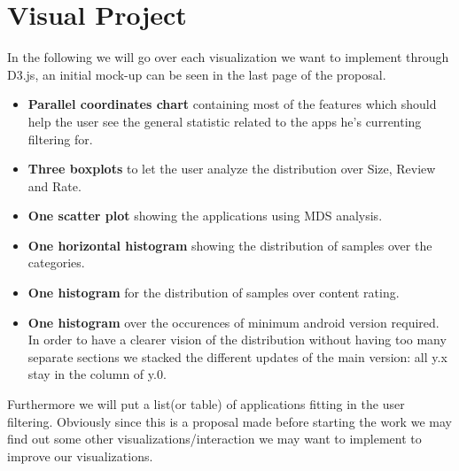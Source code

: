 \documentclass[a4paper, 11pt]{article}
\begin{document}
\section{Visual Project}
In the following we will go over each visualization we want to implement through D3.js, an initial mock-up can be seen in the last page of the proposal.
\begin{itemize}
\item \textbf{Parallel coordinates chart} containing most of the features which should help the user see the general statistic related to the apps he's currenting filtering for.
\item \textbf{Three boxplots} to let the user analyze the distribution over Size, Review and Rate.
\item \textbf{One scatter plot} showing the applications using MDS analysis.
\item \textbf{One horizontal histogram} showing the distribution of samples over the categories.
\item \textbf{One histogram} for the distribution of samples over content rating.
\item \textbf{One histogram} over the occurences of minimum android version required. In order to have a clearer vision of the distribution without having too many separate sections we stacked the different updates of the main version: all y.x stay in the column of y.0.
\end{itemize}
Furthermore we will put a list(or table) of applications fitting in the user filtering. Obviously since this is a proposal made before starting the work we may find out some other visualizations/interaction we may want to implement to improve our visualizations.
\end{document}
